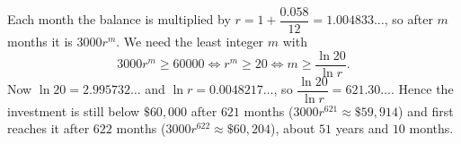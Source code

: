 Each month the balance is multiplied by $r=1+\dfrac{0.058}{12}=1.004833\ldots$, so after $m$ months it is $3000r^m$. We need the least integer $m$ with
\[
3000r^m\ge60000\iff r^m\ge20\iff m\ge\dfrac{\ln20}{\ln r}.
\]
Now $\ln20=2.995732\ldots$ and $\ln r=0.0048217\ldots$, so $\dfrac{\ln20}{\ln r}=621.30\ldots$. Hence the investment is still below $\$60{,}000$ after $621$ months ($3000r^{621}\approx\$59{,}914$) and first reaches it after $\boxed{622}$ months ($3000r^{622}\approx\$60{,}204$), about $51$ years and $10$ months.
